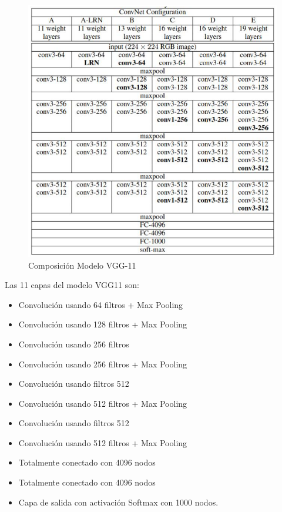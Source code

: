 			\begin{figure}[ht]
				\centering
				\includegraphics[scale=0.8]{Figs/70.png}
				\caption{Composición Modelo VGG-11}
				\label{fig:VGG11}
			\end{figure}
		
			\newpage			
			Las 11 capas del modelo VGG11 son:
				\begin{itemize}
					\item Convolución usando 64 filtros + Max Pooling
					\item Convolución usando 128 filtros + Max Pooling
					\item Convolución usando 256 filtros
					\item Convolución usando 256 filtros + Max Pooling
					\item Convolución usando filtros 512
					\item Convolución usando 512 filtros + Max Pooling
					\item Convolución usando filtros 512
					\item Convolución usando 512 filtros + Max Pooling
					\item Totalmente conectado con 4096 nodos
					\item Totalmente conectado con 4096 nodos
					\item Capa de salida con activación Softmax con 1000 nodos.
				\end{itemize}
			
